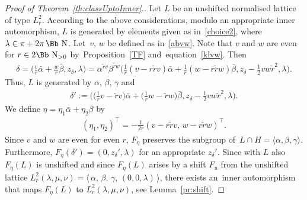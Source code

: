 \documentclass[10pt,a4paper]{amsart}
\newcommand\NN{{\mbox{\Bb N}}}
\newcommand\la{\langle}
\newcommand\ra{\rangle}
\numberwithin{equation}{section}
\begin{document}
\begin{proof}[Proof of Theorem~\ref{th:classUptoInner}.]
Let $L$ be an unshifted normalised lattice of type $L^2_r$. According to the above considerations, modulo an appropriate inner automorphism, $L$ is generated by elements given as in~\eqref{choice2}, where $\lambda\in\pi+2\pi\,\NN$. Let~$v$, $w$ be defined as in~\eqref{abvw}.
Note that $v$ and $w$ are even for $r\in2\NN_{>0}$ by~Proposition~\ref{TF} and~equation~\eqref{klvw}.
Then
\begin{gather*}
\delta= \bigg(\frac{v}{r}\bar\alpha+\frac{w}{r}\bar\beta,z_\delta,\lambda\bigg)
= \alpha^{\tilde rv}\beta^{\tilde rw}\bigg(\frac{1}{r}(v-r\tilde rv)\bar\alpha+\frac{1}{r}(w-r\tilde rw)\bar\beta,z_\delta-\frac12 vw\tilde r^2,\lambda\bigg).
\end{gather*}
Thus, $L$ is generated by $\alpha$, $\beta$, $\gamma$ and
\begin{gather*}
\delta':=\bigg(\bigg(\frac{1}{r}v-\tilde rv\bigg)\bar\alpha+\bigg(\frac{1}{r}w-\tilde rw\bigg)\bar\beta,z_\delta-\frac12 vw\tilde r^2,\lambda\bigg).
\end{gather*}
We define $\eta=\eta_1\bar \alpha +\eta_2\bar\beta$ by
\begin{gather*}
(\eta_1,\eta_2)^\top=-\frac{1}{2r}(v-r\tilde rv,\,w-r\tilde rw)^\top.
\end{gather*}
Since $v$ and $w$ are even for even $r$, $F_{\eta}$ preserves the subgroup of~$L\cap H=\la \alpha,\beta,\gamma\ra$. Furthermore, $F_{\eta}(\delta')=(0,z_\delta',\lambda)$ for an appropriate $z_\delta'$. Since with $L$ also $F_\eta(L)$ is unshifted and since $F_\eta(L)$ arises by a shift $F_u$ from the unshifted lattice $L^2_r(\lambda,\mu,\nu)=\big\langle\,\alpha,\,\beta,\,\gamma,\,(0,0,\lambda)\,\big\rangle$, there exists an~inner automorphism that maps $F_{ \eta}(L)$ to $L^2_r(\lambda,\mu,\nu)$, see Lemma~\ref{pr:shift}.


\end{proof}
\end{document}
